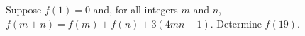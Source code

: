 Suppose $f(1)=0$ and, for all integers $m$ and $n$, $f(m+n)=f(m)+f(n)+3(4mn-1)$. Determine $f(19)$.

